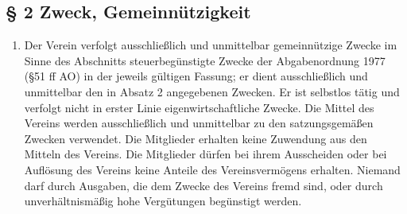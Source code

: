 ﻿\documentclass[10pt,a4paper]{scrartcl}
\newcommand{\qs}[1]{\glqq#1\grqq}
\begin{document}
\subsection*{§ 2 Zweck, Gemeinnützigkeit}
\begin{enumerate}
\item Der Verein verfolgt ausschließlich und unmittelbar gemeinnützige
Zwecke im Sinne des Abschnitts \qs{steuerbegünstigte Zwecke} der
Abgabenordnung 1977 (§51 ff AO) in der jeweils gültigen Fassung;
er dient ausschließlich und unmittelbar den in Absatz 2 angegebenen
Zwecken. Er ist selbstlos tätig und verfolgt nicht in erster Linie eigenwirtschaftliche Zwecke.
Die Mittel des Vereins werden ausschließlich und unmittelbar zu den
satzungsgemäßen Zwecken verwendet. Die Mitglieder erhalten keine
Zuwendung aus den Mitteln des Vereins. Die Mitglieder dürfen bei
ihrem Ausscheiden oder bei Auflösung des Vereins keine Anteile des
Vereinsvermögens erhalten. Niemand darf durch Ausgaben, die dem
Zwecke des Vereins fremd sind, oder durch unverhältnismäßig hohe
Ver\-gü\-tung\-en be\-güns\-tigt werden.


\end{enumerate}
\end{document}
